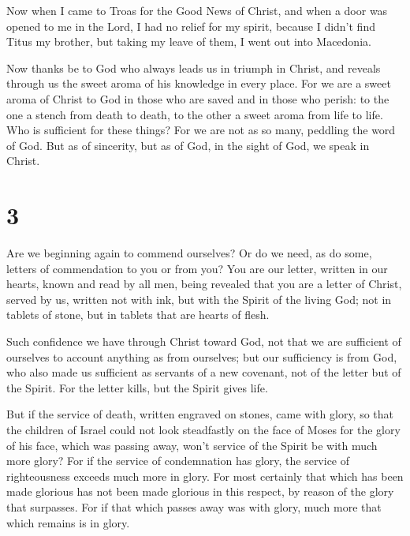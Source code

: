  Now when I came to Troas for the Good News of Christ,
and when a door was opened to me in the Lord,  I had no
relief for my spirit, because I didn't find Titus my brother, but taking
my leave of them, I went out into Macedonia.

 Now thanks be to God who always leads us in triumph in
Christ, and reveals through us the sweet aroma of his knowledge in every
place.  For we are a sweet aroma of Christ to God in
those who are saved and in those who perish:  to the one
a stench from death to death, to the other a sweet aroma from life to
life. Who is sufficient for these things?  For we are not
as so many, peddling the word of God. But as of sincerity, but as of
God, in the sight of God, we speak in Christ.

\hypertarget{section-2}{%
\section{3}\label{section-2}}

 Are we beginning again to commend ourselves? Or do we
need, as do some, letters of commendation to you or from you?
 You are our letter, written in our hearts, known and read
by all men,  being revealed that you are a letter of
Christ, served by us, written not with ink, but with the Spirit of the
living God; not in tablets of stone, but in tablets that are hearts of
flesh.

 Such confidence we have through Christ toward God,
 not that we are sufficient of ourselves to account
anything as from ourselves; but our sufficiency is from God,
 who also made us sufficient as servants of a new
covenant, not of the letter but of the Spirit. For the letter kills, but
the Spirit gives life.

 But if the service of death, written engraved on stones,
came with glory, so that the children of Israel could not look
steadfastly on the face of Moses for the glory of his face, which was
passing away,  won't service of the Spirit be with much
more glory?  For if the service of condemnation has glory,
the service of righteousness exceeds much more in glory. 
For most certainly that which has been made glorious has not been made
glorious in this respect, by reason of the glory that surpasses.
 For if that which passes away was with glory, much more
that which remains is in glory.

